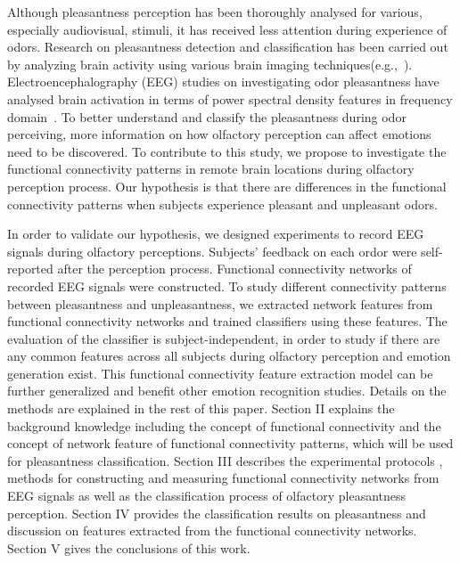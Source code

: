 Although pleasantness perception has been thoroughly analysed for various, especially audiovisual, stimuli, it has received less attention during experience of odors. Research on pleasantness detection and classification has been carried out by analyzing brain activity using various brain imaging techniques(e.g.,~\cite{zatorre2000neural,kringelbach2003activation,kroupi2014eeg}). Electroencephalography (EEG) studies on investigating odor pleasantness have analysed brain activation in terms of power spectral density features in frequency domain~\cite{kroupi2014eeg}. To better understand and classify the pleasantness during odor perceiving, more information on how olfactory perception can affect emotions need to be discovered. To contribute to this study, we propose to investigate the functional connectivity patterns in remote brain locations during olfactory perception process. Our hypothesis is that there are differences in the functional connectivity patterns when subjects experience pleasant and unpleasant odors. 

In order to validate our hypothesis, we designed experiments to record EEG signals during olfactory perceptions. Subjects' feedback on each ordor were self-reported after the perception process. Functional connectivity networks of recorded EEG signals were constructed. To study different connectivity patterns between pleasantness and unpleasantness, we extracted network features from functional connectivity networks and trained classifiers using these features. The evaluation of the classifier is subject-independent, in order to study if there are any common features across all subjects during olfactory perception and emotion generation exist. This functional connectivity feature extraction model can be further generalized and benefit other emotion recognition studies. Details on the methods are explained in the rest of this paper. Section II explains the background knowledge including the concept of functional connectivity and the concept of network feature of functional connectivity patterns, which will be used for pleasantness classification. Section III describes the experimental protocols , methods for constructing and measuring functional connectivity networks from EEG signals as well as the classification process of olfactory pleasantness perception. Section IV provides the classification results on pleasantness and discussion on features extracted from the functional connectivity networks. Section V gives the conclusions of this work. 